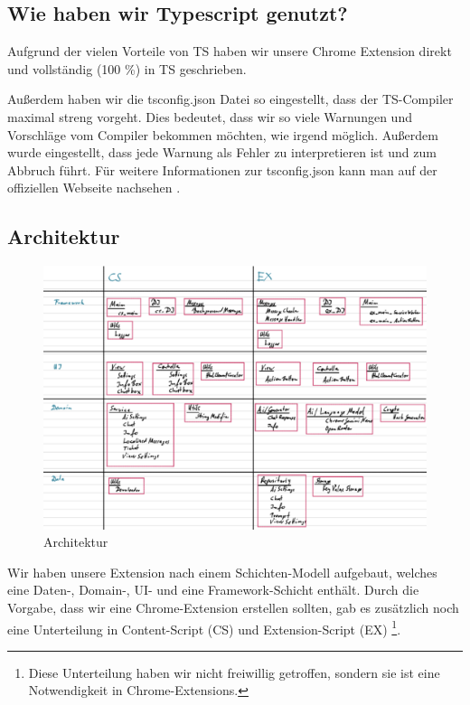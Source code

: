 \subsection{Wie haben wir Typescript genutzt?}

Aufgrund der vielen Vorteile von TS haben wir unsere Chrome Extension direkt und vollständig (100 \%) in TS geschrieben.

Außerdem haben wir die tsconfig.json Datei so eingestellt, dass der TS-Compiler maximal streng vorgeht. Dies bedeutet, dass wir so viele Warnungen und Vorschläge vom Compiler bekommen möchten, wie irgend möglich. Außerdem wurde eingestellt, dass jede Warnung als Fehler zu interpretieren ist und zum Abbruch führt. Für weitere Informationen zur tsconfig.json kann man auf der offiziellen Webseite \cite{tsconfig} nachsehen .

\subsection{Architektur}

\begin{figure}[htbp]
    \centering
    \includegraphics[width=1\textwidth]{img/Architektur.png}
    \caption{Architektur}
    \label{fig:Architektur}
  \end{figure}

  Wir haben unsere Extension nach einem Schichten-Modell aufgebaut, welches eine Daten-, Domain-, UI- und eine Framework-Schicht enthält. Durch die Vorgabe, dass wir eine Chrome-Extension erstellen sollten, gab es zusätzlich noch eine Unterteilung in Content-Script (CS) und Extension-Script (EX) \footnote{Diese Unterteilung haben wir nicht freiwillig getroffen, sondern sie ist eine Notwendigkeit in Chrome-Extensions. }.

